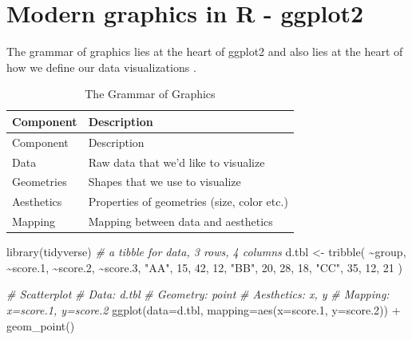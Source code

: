 \documentclass[
]{book}
\newenvironment{Shaded}{\begin{snugshade}}{\end{snugshade}}
\newcommand{\AttributeTok}[1]{\textcolor[rgb]{0.77,0.63,0.00}{#1}}
\newcommand{\CommentTok}[1]{\textcolor[rgb]{0.56,0.35,0.01}{\textit{#1}}}
\newcommand{\DecValTok}[1]{\textcolor[rgb]{0.00,0.00,0.81}{#1}}
\newcommand{\FloatTok}[1]{\textcolor[rgb]{0.00,0.00,0.81}{#1}}
\newcommand{\FunctionTok}[1]{\textcolor[rgb]{0.00,0.00,0.00}{#1}}
\newcommand{\NormalTok}[1]{#1}
\newcommand{\OtherTok}[1]{\textcolor[rgb]{0.56,0.35,0.01}{#1}}
\newcommand{\SpecialCharTok}[1]{\textcolor[rgb]{0.00,0.00,0.00}{#1}}
\newcommand{\StringTok}[1]{\textcolor[rgb]{0.31,0.60,0.02}{#1}}
\begin{document}
\hypertarget{modern-graphics-in-r---ggplot2}{%
\section{Modern graphics in R - ggplot2}\label{modern-graphics-in-r---ggplot2}}

The grammar of graphics lies at the heart of ggplot2 and also lies at the heart of how we define our data visualizations \citep{10.5555/1088896}.

\begin{longtable}[]{@{}ll@{}}
\caption{\label{tab:gog} The Grammar of Graphics}\tabularnewline
\toprule
Component & Description \\
\midrule
\endfirsthead
\toprule
Component & Description \\
\midrule
\endhead
Data & Raw data that we'd like to visualize \\
Geometries & Shapes that we use to visualize \\
Aesthetics & Properties of geometries (size, color etc.) \\
Mapping & Mapping between data and aesthetics \\
\bottomrule
\end{longtable}

\begin{Shaded}
\begin{Highlighting}[]
\FunctionTok{library}\NormalTok{(tidyverse)}
\CommentTok{\# a tibble for data, 3 rows, 4 columns}
\NormalTok{d.tbl }\OtherTok{\textless{}{-}} \FunctionTok{tribble}\NormalTok{(}
  \SpecialCharTok{\textasciitilde{}}\NormalTok{group, }\SpecialCharTok{\textasciitilde{}}\NormalTok{score}\FloatTok{.1}\NormalTok{, }\SpecialCharTok{\textasciitilde{}}\NormalTok{score}\FloatTok{.2}\NormalTok{, }\SpecialCharTok{\textasciitilde{}}\NormalTok{score}\FloatTok{.3}\NormalTok{,}
  \StringTok{"AA"}\NormalTok{, }\DecValTok{15}\NormalTok{, }\DecValTok{42}\NormalTok{, }\DecValTok{12}\NormalTok{, }
  \StringTok{"BB"}\NormalTok{, }\DecValTok{20}\NormalTok{, }\DecValTok{28}\NormalTok{, }\DecValTok{18}\NormalTok{,}
  \StringTok{"CC"}\NormalTok{, }\DecValTok{35}\NormalTok{, }\DecValTok{12}\NormalTok{, }\DecValTok{21}
\NormalTok{)}
\end{Highlighting}
\end{Shaded}

\begin{Shaded}
\begin{Highlighting}[]
\CommentTok{\# Scatterplot}
\CommentTok{\#   Data: d.tbl}
\CommentTok{\#   Geometry: point}
\CommentTok{\#   Aesthetics: x, y}
\CommentTok{\#   Mapping: x=score.1, y=score.2}
\FunctionTok{ggplot}\NormalTok{(}\AttributeTok{data=}\NormalTok{d.tbl, }\AttributeTok{mapping=}\FunctionTok{aes}\NormalTok{(}\AttributeTok{x=}\NormalTok{score}\FloatTok{.1}\NormalTok{, }\AttributeTok{y=}\NormalTok{score}\FloatTok{.2}\NormalTok{)) }\SpecialCharTok{+} \FunctionTok{geom\_point}\NormalTok{()}
\end{Highlighting}
\end{Shaded}
\end{document}
